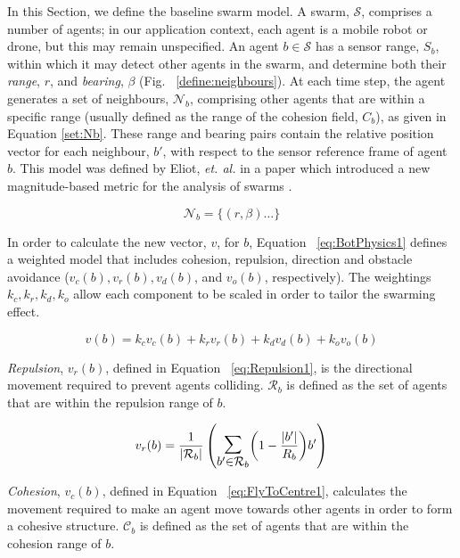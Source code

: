 \documentclass[letterpaper]{article}
\newcommand{\card}[1]{\vert{#1}\vert}
\newcommand{\magn}[1]{\vert{#1}\vert}
\begin{document}
In this Section, we define the baseline swarm model.  A swarm, $\mathcal S$,  comprises a number of agents; in our application context, each agent is a mobile robot or drone, but this may remain unspecified. An agent $b\in\mathcal S$  has a sensor range, $S_b$,  within which it may detect other agents in the swarm, and determine both their {\it range}, $r$, and {\it bearing}, $\beta$ (Fig. ~\ref{define:neighbours}).  At each time step, the agent generates a set of neighbours, $\mathcal N_b$, comprising other agents that are within a specific range (usually defined as the range of the cohesion field, $C_b$), as given in Equation \ref{set:Nb}. These range and bearing pairs contain the relative position vector for each neighbour, $b'$, with respect to the sensor reference frame of agent $b$. 
This model was defined by Eliot, {\it et. al.} in a paper which introduced a new magnitude-based metric for the analysis of swarms \citep{EKB:18}. 

\begin{equation}
\mathcal N_b = \{ (r,\beta) \ldots \}
\label{set:Nb}
\end{equation}

In order to calculate the new vector, $v$, for $b$, Equation ~\ref{eq:BotPhysics1} defines a weighted model that includes cohesion, repulsion, direction and obstacle avoidance ($v_c(b), v_r(b), v_d(b)$,  and $v_o(b)$, respectively). The weightings $k_c, k_r, k_d, k_o$ allow each component to be scaled in order to tailor the swarming effect. 

\begin{equation}\label{eq:BotPhysics1}
  v(b) = k_cv_c(b) + k_rv_r(b) + k_dv_d(b) + k_ov_o(b)
\end{equation}

\textit{Repulsion}, $v_r(b)$, defined in Equation ~\ref{eq:Repulsion1}, is the directional movement required to prevent agents colliding. $\mathcal R_b$ is defined as the set of agents that are within the repulsion range of $b$.

\begin{equation}\label{eq:Repulsion1}
v_r(b) = 
\frac{1}{\card{\mathcal R_b}}
\left(
	\mathlarger{\mathlarger{\sum_{b' \in \mathcal R_b}}}
	{\left( 1-\frac{\magn{b'}}{R_b} \right)}
	b'
\right)
\end{equation}

\textit{Cohesion}, $v_{c}(b)$, defined in Equation ~\ref{eq:FlyToCentre1}, calculates the movement required to make an agent move towards other agents in order to form a cohesive structure. $\mathcal C_b$ is defined as the set of agents that are within the cohesion range of $b$.
\end{document}
